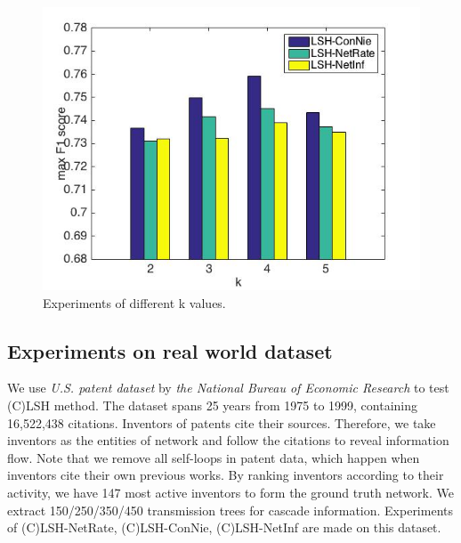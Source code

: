\begin{figure}[H]
\centerline{
\includegraphics[width=0.75\linewidth]{figures/SettingK.jpg}}
\caption{Experiments of different k values. }\label{fig:SetK}
\end{figure}
\subsection{Experiments on real world dataset}

\quad We use \emph{U.S. patent dataset} by \emph{the National Bureau of Economic Research} to test (C)LSH method. The dataset spans 25 years from 1975 to 1999, containing 16,522,438 citations. Inventors of patents cite their sources. Therefore, we take inventors as the entities of network and follow the citations to reveal information flow. Note that we remove all self-loops in patent data, which happen when inventors cite their own previous works. By ranking inventors according to their activity, we have 147 most active inventors to form the ground truth network. We extract 150/250/350/450 transmission trees for cascade information. Experiments of (C)LSH-NetRate, (C)LSH-ConNie, (C)LSH-NetInf are made on this dataset. 

